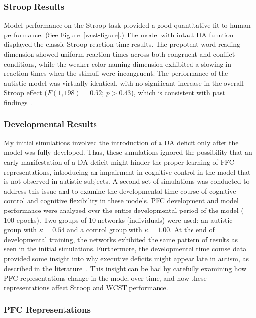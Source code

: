 \subsubsection{Stroop Results} 

Model performance on the Stroop task provided a good quantitative fit to human performance.  (See Figure~\ref{wcst-figure}.) The model with intact DA function displayed the classic Stroop reaction time results.  The prepotent word reading dimension showed uniform reaction times across both congruent and conflict conditions, while the weaker color naming dimension exhibited a slowing in reaction times when the stimuli were incongruent.  The performance of the autistic model was virtually identical, with no significant increase in the overall Stroop effect ($F(1,198) = 0.62$; $p > 0.43$), which is consistent with past findings~\cite{Ozonoff:1999:AutismStroopWCST}.


\subsubsection{Developmental Results}

My initial simulations involved the introduction of a DA deficit only
after the model was fully developed.  Thus, these simulations ignored
the possibility that an early manifestation of a DA deficit might
hinder the proper learning of PFC representations, introducing an
impairment in cognitive control in the model that is not observed in
autistic subjects.  A second set of simulations was conducted to
address this issue and to examine the developmental time course of
cognitive control and cognitive flexibility in these models.  PFC
development and model performance were analyzed over the entire
developmental period of the model ($100$ epochs).  Two groups of $10$
networks (individuals) were used: an autistic group with $\kappa = 0.54$
and a control group with $\kappa = 1.00$.  At the end of developmental
training, the networks exhibited the same pattern of results as seen
in the initial simulations.  Furthermore, the developmental time
course data provided some insight into why executive deficits might
appear late in autism, as described in the
literature~\cite{GriffithEM:1999:AutismYoungED}.  This insight can be had by carefully examining how PFC representations change in the model over time, and how these representations affect Stroop and WCST performance.

\subsubsection{PFC Representations} 

